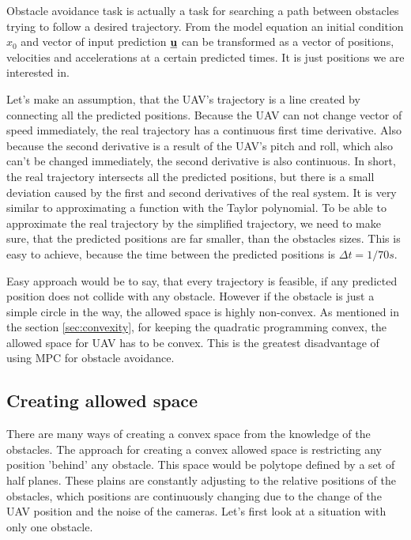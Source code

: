 \documentclass{article}
\begin{document}
Obstacle avoidance task is actually a task for searching a path between obstacles trying to follow a desired trajectory. From the model equation an initial condition $x_0$ and vector of input prediction $\textbf{\underline{u}}$ can be transformed as a vector of positions, velocities and accelerations at a certain predicted times. It is just positions we are interested in. 

Let's make an assumption, that the UAV's trajectory is a line created by connecting all the predicted positions. Because the UAV can not change vector of speed immediately, the real trajectory has a continuous first time derivative. Also because the second derivative is a result of the UAV's pitch and roll, which also can't be changed immediately, the second derivative is also continuous. In short, the real trajectory intersects all the predicted positions, but there is a small deviation caused by the first and second derivatives of the real system. It is very similar to approximating a function with the Taylor polynomial. To be able to approximate the real trajectory by the simplified trajectory, we need to make sure, that the predicted positions are far smaller, than the obstacles sizes. This is easy to achieve, because the time between the predicted positions is $\Delta t = 1/70s$.

Easy approach would be to say, that every trajectory is feasible, if any predicted position does not collide with any obstacle. However if the obstacle is just a simple circle in the way, the allowed space is highly non-convex. As mentioned in the section \ref{sec:convexity}, for keeping the quadratic programming convex, the allowed space for UAV has to be convex. This is the greatest disadvantage of using MPC for obstacle avoidance. 

\subsection{Creating allowed space}

There are many ways of creating a convex space from the knowledge of the obstacles.
The approach for creating a convex allowed space is restricting any position 'behind' any obstacle. This space would be polytope defined by a set of half planes. These plains are constantly adjusting to the relative positions of the obstacles, which positions are continuously changing due to the change of the UAV position and the noise of the cameras. Let's first look at a situation with only one obstacle. 
\end{document}
